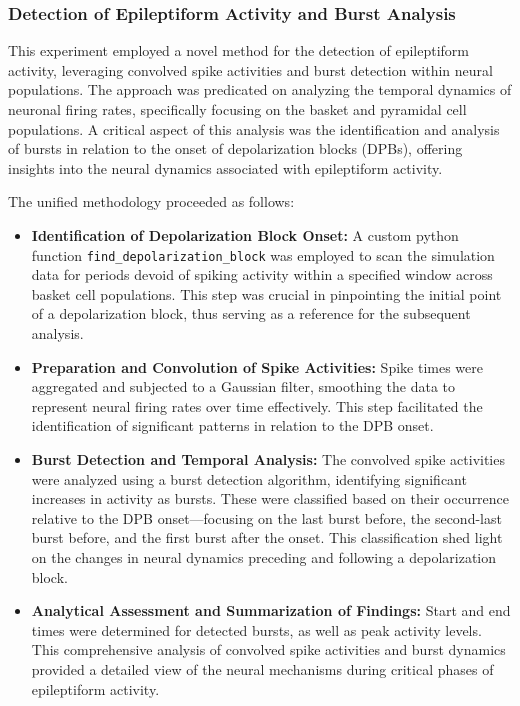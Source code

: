 \subsubsection{Detection of Epileptiform Activity and Burst Analysis}
This experiment employed a novel method for the detection of epileptiform
activity, leveraging convolved spike activities and burst detection within
neural populations. The approach was predicated on analyzing the temporal
dynamics of neuronal firing rates, specifically focusing on the basket and
pyramidal cell populations. A critical aspect of this analysis was the
identification and analysis of bursts in relation to the onset of
depolarization blocks (DPBs), offering insights into the neural dynamics
associated with epileptiform activity.

\noindent The unified methodology proceeded as follows:
\begin{itemize}
    \item \textbf{Identification of Depolarization Block Onset:} A custom python function \lstinline{find_depolarization_block} was employed to scan the simulation data for periods devoid of spiking activity within a specified window across basket cell populations.
          This step was crucial in pinpointing the initial point of a depolarization block, thus serving as a reference for the subsequent analysis.

    \item \textbf{Preparation and Convolution of Spike Activities:} Spike times were aggregated and subjected to a Gaussian filter, smoothing the data to represent neural firing rates over time effectively.
          This step facilitated the identification of significant patterns in relation to the DPB onset.

    \item \textbf{Burst Detection and Temporal Analysis:} The convolved spike activities were analyzed using a burst detection algorithm, identifying significant increases in activity as bursts.
          These were classified based on their occurrence relative to the DPB onset—focusing on the last burst before, the second-last burst before, and the first burst after the onset. This classification shed light on the changes in neural dynamics preceding and following a depolarization block.

    \item \textbf{Analytical Assessment and Summarization of Findings:} Start and end times were determined for detected bursts, as well as peak activity levels.
          This comprehensive analysis of convolved spike activities and burst dynamics provided a detailed view of the neural mechanisms during critical phases of epileptiform activity.
\end{itemize}

